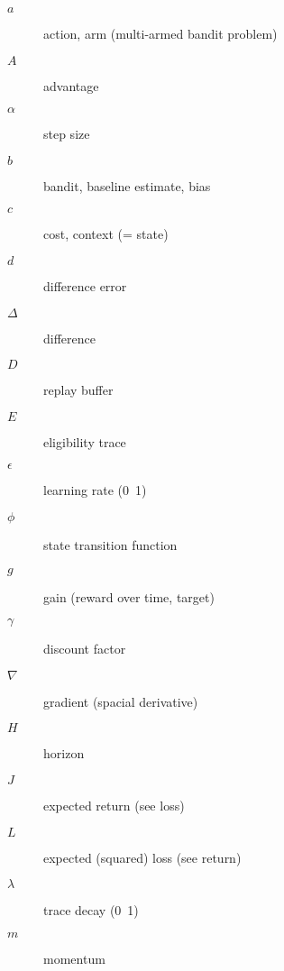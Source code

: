 \documentclass[10pt,landscape]{article}
\begin{document}
\begin{multicols}{3}
\begin{description}
    \item[$a$]
    action, arm (multi-armed bandit problem)
    \item[$A$]
    advantage
    \item[$\alpha$]
    step size
    \item[$b$]
    bandit, baseline estimate, bias
    \item[$c$]
    cost, context (= state)
    \item[$d$]
    difference error
    \item[$\Delta$]
    difference
    \item[$D$]
    replay buffer
    \item[$E$]
    eligibility trace %
    \item[$\epsilon$]
    learning rate (0~1)
    \item[$\phi$]
    state transition function
    \item[$g$]
    gain (reward over time, target)
    \item[$\gamma$]
    discount factor
    \item[$\nabla$]
    gradient (spacial derivative)
    \item[$H$]
    horizon
    \item[$J$]
    expected return (see loss)
    \item[$L$]
    expected (squared) loss (see return)
    \item[$\lambda$]
    trace decay (0~1)
    \item[$m$]
    momentum %

\end{description}
\end{multicols}
\end{document}
